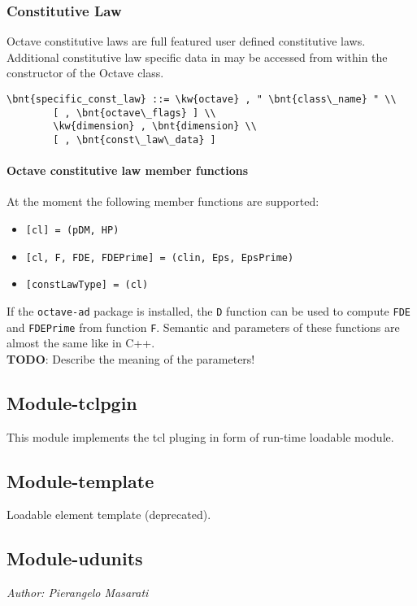\subsubsection{Constitutive Law}
Octave constitutive laws are full featured user defined constitutive laws.
Additional constitutive law specific data in  may be accessed from within the constructor of the Octave class.
\begin{Verbatim}[commandchars=\\\{\}]
    \bnt{specific_const_law} ::= \kw{octave} , " \bnt{class\_name} " \\
        [ , \bnt{octave\_flags} ] \\
        \kw{dimension} , \bnt{dimension} \\
        [ , \bnt{const\_law\_data} ]
\end{Verbatim}

\paragraph{Octave constitutive law member functions}
At the moment the following member functions are supported:
\begin{itemize}
\item \verb![cl] = !\verb!(pDM, HP) !
\item \verb![cl, F, FDE, FDEPrime] = !\verb!(clin, Eps, EpsPrime) !
\item \verb![constLawType] = !\verb!(cl) !
\end{itemize}
If the \texttt{octave-ad} package is installed, the \texttt{D} function
can be used to compute \texttt{FDE} and \texttt{FDEPrime}
from function \texttt{F}.
Semantic and parameters of these functions are almost the same like in C++. \\
\textbf{TODO}: Describe the meaning of the parameters!

\subsection{Module-tclpgin}
This module implements the tcl pluging in form of run-time loadable module.
 
\subsection{Module-template}
Loadable element template (deprecated).

\subsection{Module-udunits}
\emph{Author: Pierangelo Masarati}

